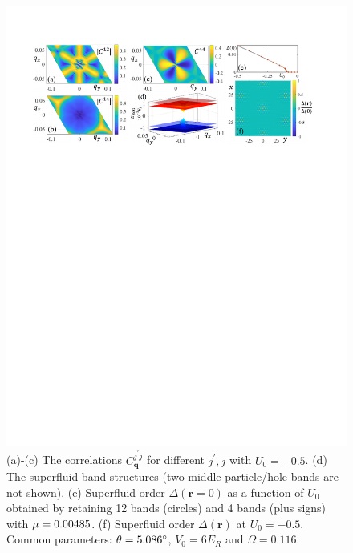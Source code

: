 \documentclass[twocolumn,english,prl,floatfix,citeautoscript,nofootinbib]{revtex4}
\begin{document}
\begin{widetext}
\begin{figure}[tb]
\includegraphics[width=1.0\linewidth]{FigS3_r.pdf}
\caption{(a)-(c) The correlations $C_{\mathbf{q}}^{j^{\prime }j}$ for
different $j^{\prime },j$ with $U_{0}=-0.5$. (d) The superfluid band
structures (two middle particle/hole bands are not shown). (e) Superfluid
order $\Delta (\mathbf{r}=0)$ as a function of $U_{0}$ obtained by retaining
12 bands (circles) and 4 bands (plus signs) with $\protect\mu =0.00485$. (f)
Superfluid order $\Delta (\mathbf{r})$ at $U_{0}=-0.5$. Common parameters: $%
\protect\theta =5.086^{\circ }$, $V_{0}=6E_{R}$ and $\Omega =0.116$.}
\label{fig:S3}
\end{figure}


\end{widetext}
\end{document}

